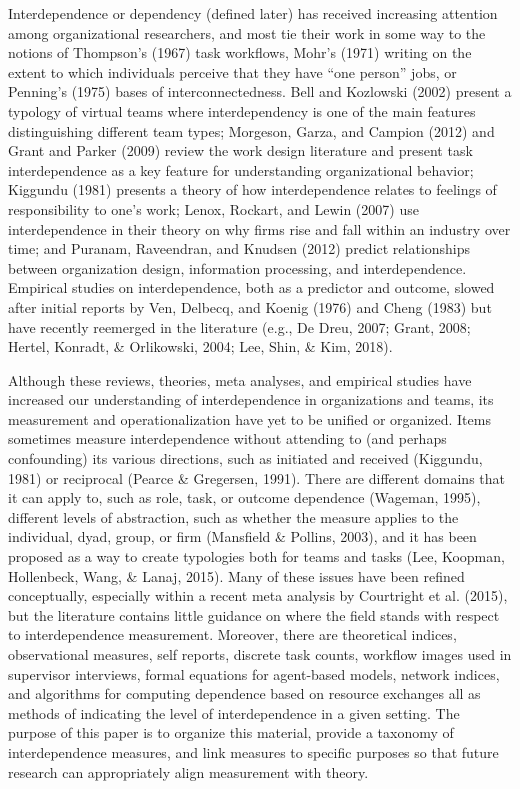 \documentclass[english,,man]{apa6}
\theoremstyle{definition}
\theoremstyle{definition}
\theoremstyle{definition}
\theoremstyle{remark}
\begin{document}
Interdependence or dependency (defined later) has received increasing
attention among organizational researchers, and most tie their work in
some way to the notions of Thompson's (1967) task workflows, Mohr's
(1971) writing on the extent to which individuals perceive that they
have \enquote{one person} jobs, or Penning's (1975) bases of
interconnectedness. Bell and Kozlowski (2002) present a typology of
virtual teams where interdependency is one of the main features
distinguishing different team types; Morgeson, Garza, and Campion (2012)
and Grant and Parker (2009) review the work design literature and
present task interdependence as a key feature for understanding
organizational behavior; Kiggundu (1981) presents a theory of how
interdependence relates to feelings of responsibility to one's work;
Lenox, Rockart, and Lewin (2007) use interdependence in their theory on
why firms rise and fall within an industry over time; and Puranam,
Raveendran, and Knudsen (2012) predict relationships between
organization design, information processing, and interdependence.
Empirical studies on interdependence, both as a predictor and outcome,
slowed after initial reports by Ven, Delbecq, and Koenig (1976) and
Cheng (1983) but have recently reemerged in the literature (e.g., De
Dreu, 2007; Grant, 2008; Hertel, Konradt, \& Orlikowski, 2004; Lee,
Shin, \& Kim, 2018).

Although these reviews, theories, meta analyses, and empirical studies
have increased our understanding of interdependence in organizations and
teams, its measurement and operationalization have yet to be unified or
organized. Items sometimes measure interdependence without attending to
(and perhaps confounding) its various directions, such as initiated and
received (Kiggundu, 1981) or reciprocal (Pearce \& Gregersen, 1991).
There are different domains that it can apply to, such as role, task, or
outcome dependence (Wageman, 1995), different levels of abstraction,
such as whether the measure applies to the individual, dyad, group, or
firm (Mansfield \& Pollins, 2003), and it has been proposed as a way to
create typologies both for teams and tasks (Lee, Koopman, Hollenbeck,
Wang, \& Lanaj, 2015). Many of these issues have been refined
conceptually, especially within a recent meta analysis by Courtright et
al. (2015), but the literature contains little guidance on where the
field stands with respect to interdependence measurement. Moreover,
there are theoretical indices, observational measures, self reports,
discrete task counts, workflow images used in supervisor interviews,
formal equations for agent-based models, network indices, and algorithms
for computing dependence based on resource exchanges all as methods of
indicating the level of interdependence in a given setting. The purpose
of this paper is to organize this material, provide a taxonomy of
interdependence measures, and link measures to specific purposes so that
future research can appropriately align measurement with theory.
\end{document}
